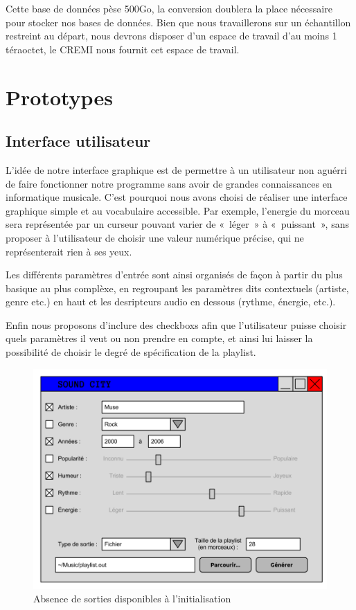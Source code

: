 \documentclass[11pt,a4paper]{article}
\begin{document}
Cette base de données pèse 500Go, la conversion doublera la place nécessaire pour
stocker nos bases de données. Bien que nous travaillerons sur un échantillon
restreint au départ, nous devrons disposer d’un espace de travail d’au moins 1
téraoctet, le CREMI nous fournit cet espace de travail.

\newpage

\section{Prototypes}
\label{sec:proto}

\subsection{Interface utilisateur}
    
L'idée de notre interface graphique est de permettre à un utilisateur non aguérri
de faire fonctionner notre programme sans avoir de grandes connaissances en
informatique musicale. C'est pourquoi nous avons choisi de réaliser une interface
graphique simple et au vocabulaire accessible. Par exemple, l'energie du morceau
sera représentée par un curseur pouvant varier de «~léger~» à «~puissant~», sans
proposer à l'utilisateur de choisir une valeur numérique précise, qui ne
représenterait rien à ses yeux.
    
Les différents paramètres d'entrée sont ainsi organisés de façon à partir du plus
basique au plus complèxe, en regroupant les paramètres dits contextuels (artiste,
genre etc.) en haut et les desripteurs audio en dessous (rythme, énergie, etc.).

Enfin nous proposons d'inclure des checkboxs afin que l'utilisateur puisse
choisir quels paramètres il veut ou non prendre en compte, et ainsi lui laisser
la possibilité de choisir le degré de spécification de la playlist.
    
\begin{figure}[!h]
\includegraphics[width=14cm]{interface_utilisateur.png}
\caption{Absence de sorties disponibles à l'initialisation}
\end{figure}
\end{document}
